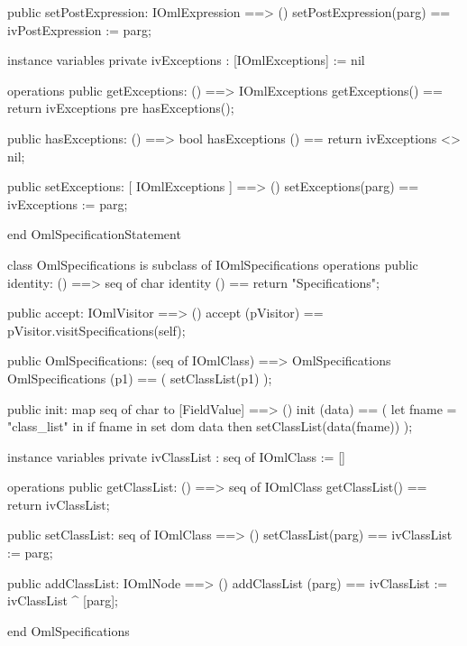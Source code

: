 \begin{vdm_al}
  public setPostExpression: IOmlExpression ==> ()
  setPostExpression(parg) == ivPostExpression := parg;

instance variables
  private ivExceptions : [IOmlExceptions] := nil

operations
  public getExceptions: () ==> IOmlExceptions
  getExceptions() == return ivExceptions
    pre hasExceptions();

  public hasExceptions: () ==> bool
  hasExceptions () == return ivExceptions <> nil;

  public setExceptions: [ IOmlExceptions ] ==> ()
  setExceptions(parg) == ivExceptions := parg;

end OmlSpecificationStatement
\end{vdm_al}

\begin{vdm_al}
class OmlSpecifications is subclass of IOmlSpecifications
operations
  public identity: () ==> seq of char
  identity () == return "Specifications";

  public accept: IOmlVisitor ==> ()
  accept (pVisitor) == pVisitor.visitSpecifications(self);

  public OmlSpecifications:
      (seq of IOmlClass) ==> OmlSpecifications
  OmlSpecifications (p1) == 
   ( setClassList(p1) );

  public init: map seq of char to [FieldValue] ==> ()
  init (data) ==
    ( let fname = "class_list" in
        if fname in set dom data
        then setClassList(data(fname)) );

instance variables
  private ivClassList : seq of IOmlClass := []

operations
  public getClassList: () ==> seq of IOmlClass
  getClassList() == return ivClassList;

  public setClassList: seq of IOmlClass ==> ()
  setClassList(parg) == ivClassList := parg;

  public addClassList: IOmlNode ==> ()
  addClassList (parg) == ivClassList := ivClassList ^ [parg];

end OmlSpecifications
\end{vdm_al}

